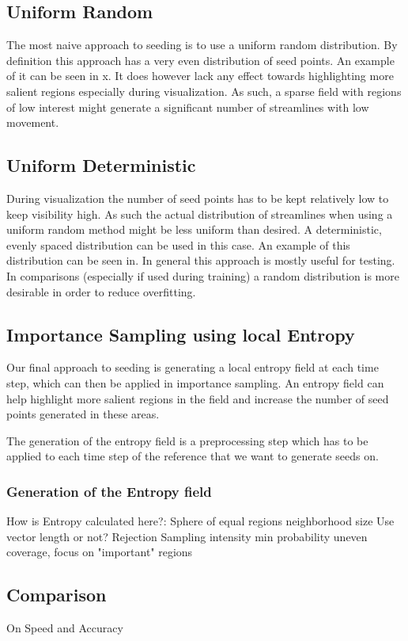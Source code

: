 \subsection{Uniform Random}
The most naive approach to seeding is to use a uniform random distribution.
By definition this approach has a very even distribution of seed points. An example of it can be seen in x.
It does however lack any effect towards highlighting more salient regions especially during visualization.
As such, a sparse field with regions of low interest might generate a significant number of streamlines with low movement.
\subsection{Uniform Deterministic}
During visualization the number of seed points has to be kept relatively low to keep visibility high. 
As such the actual distribution of streamlines when using a uniform random method might be less uniform than desired.
A deterministic, evenly spaced distribution can be used in this case.
An example of this distribution can be seen in.
In general this approach is mostly useful for testing. 
In comparisons (especially if used during training) a random distribution is more desirable in order to reduce overfitting.
\subsection{Importance Sampling using local Entropy}
Our final approach to seeding is generating a local entropy field at each time step, which can then be applied in importance sampling.
An entropy field can help highlight more salient regions in the field and increase the number of seed points generated in these areas.

The generation of the entropy field is a preprocessing step which has to be applied to each time step of the reference that we want to generate seeds on.
\subsubsection{Generation of the Entropy field}
How is Entropy calculated here?:
  Sphere of equal regions
  neighborhood size
  Use vector length or not?
Rejection Sampling
  intensity
  min probability
uneven coverage, focus on "important" regions
\subsection{Comparison}
On Speed and Accuracy

